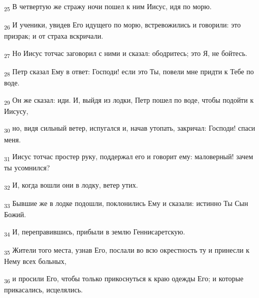 \begin{tcolorbox}
\textsubscript{25} В четвертую же стражу ночи пошел к ним Иисус, идя по морю.
\end{tcolorbox}
\begin{tcolorbox}
\textsubscript{26} И ученики, увидев Его идущего по морю, встревожились и говорили: это призрак; и от страха вскричали.
\end{tcolorbox}
\begin{tcolorbox}
\textsubscript{27} Но Иисус тотчас заговорил с ними и сказал: ободритесь; это Я, не бойтесь.
\end{tcolorbox}
\begin{tcolorbox}
\textsubscript{28} Петр сказал Ему в ответ: Господи! если это Ты, повели мне придти к Тебе по воде.
\end{tcolorbox}
\begin{tcolorbox}
\textsubscript{29} Он же сказал: иди. И, выйдя из лодки, Петр пошел по воде, чтобы подойти к Иисусу,
\end{tcolorbox}
\begin{tcolorbox}
\textsubscript{30} но, видя сильный ветер, испугался и, начав утопать, закричал: Господи! спаси меня.
\end{tcolorbox}
\begin{tcolorbox}
\textsubscript{31} Иисус тотчас простер руку, поддержал его и говорит ему: маловерный! зачем ты усомнился?
\end{tcolorbox}
\begin{tcolorbox}
\textsubscript{32} И, когда вошли они в лодку, ветер утих.
\end{tcolorbox}
\begin{tcolorbox}
\textsubscript{33} Бывшие же в лодке подошли, поклонились Ему и сказали: истинно Ты Сын Божий.
\end{tcolorbox}
\begin{tcolorbox}
\textsubscript{34} И, переправившись, прибыли в землю Геннисаретскую.
\end{tcolorbox}
\begin{tcolorbox}
\textsubscript{35} Жители того места, узнав Его, послали во всю окрестность ту и принесли к Нему всех больных,
\end{tcolorbox}
\begin{tcolorbox}
\textsubscript{36} и просили Его, чтобы только прикоснуться к краю одежды Его; и которые прикасались, исцелялись.
\end{tcolorbox}
